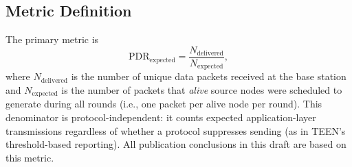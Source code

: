 ﻿\documentclass[sensors,article,submit,moreauthors,pdftex]{Definitions/mdpi}
\begin{document}
\subsection{Metric Definition}
The primary metric is
\begin{equation}
\mathrm{PDR}_{\mathrm{expected}} = \frac{N_{\mathrm{delivered}}}{N_{\mathrm{expected}}},
\end{equation}
where $N_{\mathrm{delivered}}$ is the number of unique data packets received at the base station and $N_{\mathrm{expected}}$ is the number of packets that \emph{alive} source nodes were scheduled to generate during all rounds (i.e., one packet per alive node per round). This denominator is protocol-independent: it counts expected application-layer transmissions regardless of whether a protocol suppresses sending (as in TEEN's threshold-based reporting). All publication conclusions in this draft are based on this metric.
\end{document}
